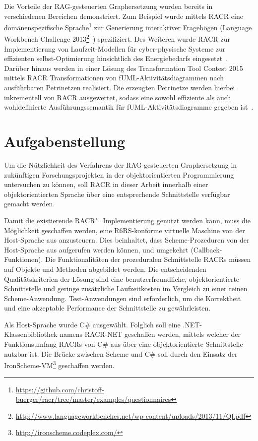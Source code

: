 Die Vorteile der RAG-gesteuerten Graphersetzung wurden bereits in verschiedenen Bereichen demonstriert. Zum Beispiel wurde mittels RACR eine domänenspezifische Sprache\footnote{\url{https://github.com/christoff-buerger/racr/tree/master/examples/questionnaires}} zur Generierung interaktiver Fragebögen (Language Workbench Challenge 2013\footnote{\url{http://www.languageworkbenches.net/wp-content/uploads/2013/11/Ql.pdf}}~\cite{Erdweg2013}) spezifiziert. Des Weiteren wurde RACR zur Implementierung von Laufzeit-Modellen für cyber-physische Systeme zur effizienten selbst-Optimierung hinsichtlich des Energiebedarfs eingesetzt~\cite{Buerger2015}. Darüber hinaus werden in einer Lösung des Transformation Tool Contest 2015~\cite{Mayerhofer2015} mittels RACR Transformationen von fUML-Aktivitätsdiagrammen nach ausführbaren Petrinetzen realisiert. Die erzeugten Petrinetze werden hierbei inkrementell von RACR ausgewertet, sodass eine sowohl effiziente als auch wohldefinierte Ausführungssemantik für fUML-Aktivitätsdiagramme gegeben ist~\cite{Buerger2015a}.

\section{Aufgabenstellung}

Um die Nützlichkeit des Verfahrens der RAG-gesteuerten Graphersetzung in zukünftigen Forschungsprojekten in der objektorientierten Programmierung untersuchen zu können, soll RACR in dieser Arbeit innerhalb einer objektorientierten Sprache über eine entsprechende Schnittstelle verfügbar gemacht werden.

Damit die existierende RACR"=Implementierung genutzt werden kann, muss die Möglichkeit geschaffen werden, eine R6RS-konforme virtuelle Maschine von der Host-Sprache aus anzusteuern. Dies beinhaltet, dass Scheme-Prozeduren von der Host-Sprache aus aufgerufen werden können, und umgekehrt (Callback-Funktionen). Die Funktionalitäten der prozeduralen Schnittstelle RACRs müssen auf Objekte und Methoden abgebildet werden. Die entscheidenden Qualitätskriterien der Lösung sind eine benutzerfreundliche, objektorientierte Schnittstelle und geringe zusätzliche Laufzeitkosten im Vergleich zu einer reinen Scheme-Anwendung. Test-Anwendungen sind erforderlich, um die Korrektheit und eine akzeptable Performance der Schnittstelle zu gewährleisten.

Als Host-Sprache wurde C\# ausgewählt. Folglich soll eine .NET-Klassenbibliothek namens RACR-NET geschaffen werden, mittels welcher der Funktionsumfang RACRs von C\# aus über eine objektorientierte Schnittstelle nutzbar ist. Die Brücke zwischen Scheme und C\# soll durch den Einsatz der IronScheme-VM\footnote{\url{http://ironscheme.codeplex.com/}} geschaffen werden.

